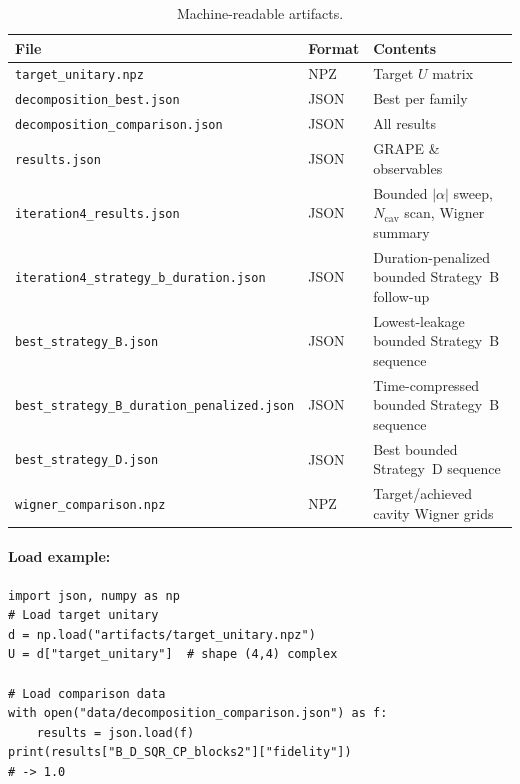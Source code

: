 \documentclass[aps,pra,twocolumn,reprint,floatfix,amsmath,amssymb]{revtex4-2}
\begin{document}
\begin{table}[h]
  \centering
  \caption{Machine-readable artifacts.}\label{tab:artifacts}
  \begin{tabular}{@{} l l l @{}}
    \toprule
    File & Format & Contents \\
    \midrule
    \texttt{target\_unitary.npz} & NPZ & Target $U$ matrix \\
    \texttt{decomposition\_best.json} & JSON & Best per family \\
    \texttt{decomposition\_comparison.json} & JSON & All results \\
    \texttt{results.json} & JSON & GRAPE \& observables \\
    \texttt{iteration4\_results.json} & JSON & Bounded $|\alpha|$ sweep, $N_\mathrm{cav}$ scan, Wigner summary \\
    \texttt{iteration4\_strategy\_b\_duration.json} & JSON & Duration-penalized bounded Strategy~B follow-up \\
    \texttt{best\_strategy\_B.json} & JSON & Lowest-leakage bounded Strategy~B sequence \\
    \texttt{best\_strategy\_B\_duration\_penalized.json} & JSON & Time-compressed bounded Strategy~B sequence \\
    \texttt{best\_strategy\_D.json} & JSON & Best bounded Strategy~D sequence \\
    \texttt{wigner\_comparison.npz} & NPZ & Target/achieved cavity Wigner grids \\
    \bottomrule
  \end{tabular}
\end{table}

\paragraph{Load example:}
\begin{verbatim}
import json, numpy as np
# Load target unitary
d = np.load("artifacts/target_unitary.npz")
U = d["target_unitary"]  # shape (4,4) complex

# Load comparison data
with open("data/decomposition_comparison.json") as f:
    results = json.load(f)
print(results["B_D_SQR_CP_blocks2"]["fidelity"])
# -> 1.0
\end{verbatim}

\end{document}
